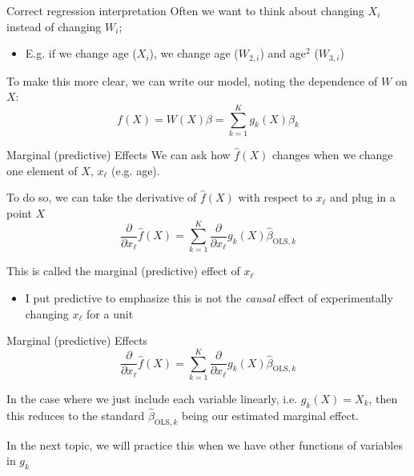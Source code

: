 \documentclass[aspectratio=169,t,11pt,table]{beamer}
\begin{document}
\begin{frame}{Correct regression interpretation}
  Often we want to think about changing $X_i$ instead of changing $W_i$;
  \begin{itemize}
    \item E.g. if we change age ($X_i$), we change age ($W_{2,i}$) and age$^2$ ($W_{3,i}$)
  \end{itemize}

  \bigskip
  To make this more clear, we can write our model, noting the dependence of $W$ on $X$:
  $$
    f(X) = W(X) \beta = \sum_{k=1}^K g_{k}(X) \beta_k
  $$
\end{frame}

\begin{frame}{Marginal (predictive) Effects}
  We can ask how $\hat{f}(X)$ changes when we change one element of $X$, $x_\ell$ (e.g. age).

  \bigskip
  To do so, we can take the derivative of $\hat{f}(X)$ with respect to $x_\ell$ and plug in a point $X$
  $$
    \frac{\partial}{\partial x_\ell} \hat{f}(X) = 
    \sum_{k=1}^K \frac{\partial}{\partial x_\ell} g_{k}(X) \hat{\beta}_{\text{OLS}, k}
  $$
  
  \bigskip
  This is called the \alert{marginal (predictive) effect} of $x_\ell$
  \begin{itemize}
    \item I put predictive to emphasize this is not the \emph{causal} effect of experimentally changing $x_\ell$ for a unit 
  \end{itemize}
\end{frame}

\begin{frame}{Marginal (predictive) Effects}
  \vspace*{-\bigskipamount}
  $$
    \frac{\partial}{\partial x_\ell} \hat{f}(X) = 
    \sum_{k=1}^K \frac{\partial}{\partial x_\ell} g_{k}(X) \hat{\beta}_{\text{OLS}, k}
  $$
  
  \bigskip
  In the case where we just include each variable linearly, i.e. $g_k(X) = X_k$, then this reduces to the standard $\hat{\beta}_{\text{OLS}, k}$ being our estimated marginal effect.

  \pause
  \bigskip
  In the next topic, we will practice this when we have other functions of variables in $g_k$
\end{frame}
\end{document}
